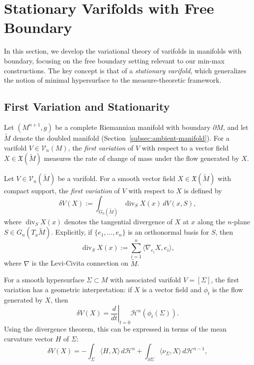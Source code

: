 \section{Stationary Varifolds with Free Boundary}\label{sec:stationary-varifolds}
In this section, we develop the variational theory of varifolds in manifolds with boundary, focusing on the free boundary setting relevant to our min-max constructions. The key concept is that of a \emph{stationary varifold}, which generalizes the notion of minimal hypersurface to the measure-theoretic framework.

\subsection{First Variation and Stationarity}\label{subsec:first-variation}

Let $(M^{n+1}, g)$ be a complete Riemannian manifold with boundary $\partial M$, and let $\widetilde{M}$
denote the doubled manifold (Section~\ref{subsec:ambient-manifold}). For a varifold
$V \in \mathcal{V}_n(M)$, the \emph{first variation} of $V$ with respect to a vector field
$X \in \mathfrak{X}(\widetilde{M})$ measures the rate of change of mass under the flow generated by $X$.

\begin{definition}\label{def:first-variation-varifold}
Let $V \in \mathcal{V}_n(\widetilde{M})$ be a varifold. For a smooth vector field
$X \in \mathfrak{X}(\widetilde{M})$ with compact support, the \emph{first variation} of $V$ with respect
to $X$ is defined by
\[
    \delta V(X) := \int_{G_n(\widetilde{M})} \operatorname{div}_S X(x)\, dV(x, S),
\]
where $\operatorname{div}_S X(x)$ denotes the tangential divergence of $X$ at $x$ along the $n$-plane
$S \in G_n(T_x \widetilde{M})$. Explicitly, if $\{e_1, \ldots, e_n\}$ is an orthonormal basis for $S$,
then
\[
    \operatorname{div}_S X(x) := \sum_{i=1}^n \langle \nabla_{e_i} X, e_i \rangle,
\]
where $\nabla$ is the Levi-Civita connection on $\widetilde{M}$.
\end{definition}

For a smooth hypersurface $\Sigma \subset M$ with associated varifold $V = [\Sigma]$, the first
variation has a geometric interpretation: if $X$ is a vector field and $\phi_t$ is the flow generated
by $X$, then
\[
    \delta V(X) = \left. \frac{d}{dt} \right|_{t=0} \mathcal{H}^n(\phi_t(\Sigma)).
\]
Using the divergence theorem, this can be expressed in terms of the mean curvature vector $H$ of $\Sigma$:
\[
    \delta V(X) = -\int_\Sigma \langle H, X \rangle\, d\mathcal{H}^n + \int_{\partial \Sigma} \langle \nu_\Sigma, X \rangle\, d\mathcal{H}^{n-1},
\]

